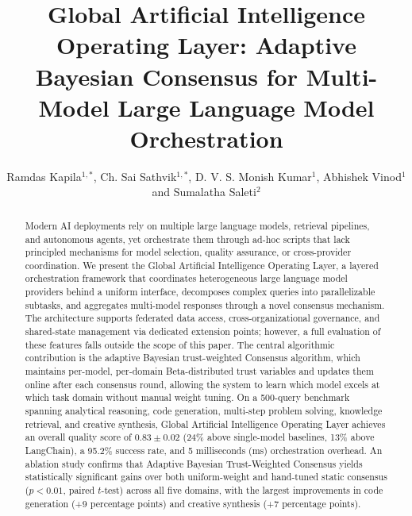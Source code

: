 \documentclass{iopjournal}
\begin{document}
\title{Global Artificial Intelligence Operating Layer: Adaptive Bayesian Consensus for Multi-Model Large Language Model Orchestration}

\author{Ramdas Kapila$^{1,*}$, Ch. Sai Sathvik$^{1,*}$, D. V. S. Monish Kumar$^1$, Abhishek Vinod$^1$ and Sumalatha Saleti$^2$}






\begin{abstract}
Modern AI deployments rely on multiple large language models, retrieval pipelines, and autonomous agents, yet orchestrate them through ad-hoc scripts that lack principled mechanisms for model selection, quality assurance, or cross-provider coordination. We present the Global Artificial Intelligence Operating Layer, a layered orchestration framework that coordinates heterogeneous large language model providers behind a uniform interface, decomposes complex queries into parallelizable subtasks, and aggregates multi-model responses through a novel consensus mechanism. The architecture supports federated data access, cross-organizational governance, and shared-state management via dedicated extension points; however, a full evaluation of these features falls outside the scope of this paper. The central algorithmic contribution is the adaptive Bayesian trust-weighted Consensus algorithm, which maintains per-model, per-domain Beta-distributed trust variables and updates them online after each consensus round, allowing the system to learn which model excels at which task domain without manual weight tuning. On a 500-query benchmark spanning analytical reasoning, code generation, multi-step problem solving, knowledge retrieval, and creative synthesis, Global Artificial Intelligence Operating Layer achieves an overall quality score of $0.83 \pm 0.02$ (24\% above single-model baselines, 13\% above LangChain), a 95.2\% success rate, and 5 milliseconds (ms) orchestration overhead. An ablation study confirms that Adaptive Bayesian Trust-Weighted Consensus yields statistically significant gains over both uniform-weight and hand-tuned static consensus ($p < 0.01$, paired $t$-test) across all five domains, with the largest improvements in code generation (+9 percentage points) and creative synthesis (+7 percentage points).
\end{abstract}
\end{document}
